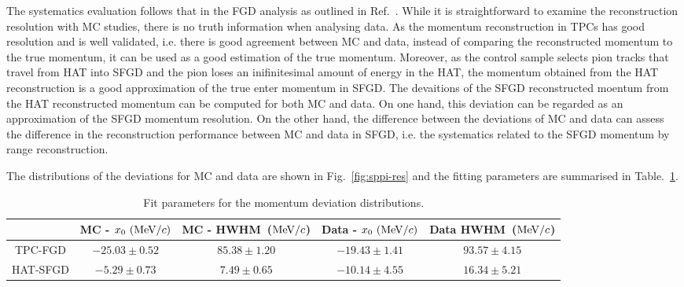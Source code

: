           The systematics evaluation follows that in the FGD analysis as outlined in Ref.~\cite{Jenkins:2022ljx}.
          While it is straightforward to examine the reconstruction resolution with MC studies, there is no truth information when analysing data.
          As the momentum reconstruction in TPCs has good resolution and is well validated, i.e. there is good agreement between MC and data, instead of comparing the reconstructed momentum to the true momentum, it can be used as a good estimation of the true momentum.
          Moreover, as the control sample selects pion tracks that travel from HAT into SFGD and the pion loses an inifinitesimal amount of energy in the HAT, the momentum obtained from the HAT reconstruction is a good approximation of the true enter momentum in SFGD.
          The devaitions of the SFGD reconstructed moentum from the HAT reconstructed momentum can be computed for both MC and data.
          On one hand, this deviation can be regarded as an approximation of the SFGD momentum resolution.
          On the other hand, the difference between the deviations of MC and data can assess the difference in the reconstruction performance between MC and data in SFGD, i.e. the systematics related to the SFGD momentum by range reconstruction.

          The distributions of the deviations for MC and data are shown in Fig.~\ref{fig:sppi-res} and the fitting parameters are summarised in Table.~\ref{tab:sppi-res}.

          \begin{table}[htbp]
          \centering
          \begin{tabular}{c|cccc}
                       & MC - $x_0~(\textrm{MeV}/c)$ & MC - HWHM~($\textrm{MeV}/c$) & Data - $x_0~(\textrm{MeV}/c)$ & Data HWHM~($\textrm{MeV}/c$)\\
          \hline
          TPC-FGD & $-25.03 \pm 0.52$ & $85.38 \pm 1.20$ & $-19.43 \pm 1.41$ & $93.57 \pm 4.15$ \\
          HAT-SFGD & $-5.29 \pm 0.73$  & $7.49 \pm 0.65$  & $-10.14 \pm 4.55$  & $16.34 \pm 5.21$ \\
          \end{tabular}
          \caption{Fit parameters for the momentum deviation distributions.}
          \label{tab:sppi-res}
          \end{table}

